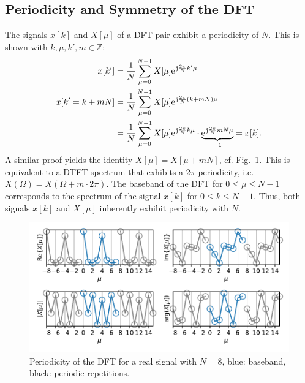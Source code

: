 \documentclass[11pt,a4paper,DIV=12]{scrartcl}
\begin{document}
\subsection{Periodicity and Symmetry of the DFT}
The signals $x[k]$ and $X[\mu]$ of a DFT pair exhibit a periodicity of $N$.
%
This is shown with $k,\mu,k',m\in\mathbb{Z}$:
\begin{align}
x[k']&=\frac{1}{N}\sum_{\mu=0}^{N-1}X[\mu]\e^{\im\frac{2\pi}{N}k'\mu}\\
x[k'=k+m N]&=\frac{1}{N}\sum_{\mu=0}^{N-1}X[\mu]\e^{\im\frac{2\pi}{N}(k+mN)\mu}\\
&=\frac{1}{N}\sum_{\mu=0}^{N-1}X[\mu]\e^{\im\frac{2\pi}{N}k\mu}\cdot\underbrace{\e^{\im\frac{2\pi}{N}mN\mu}}_{=1}=x[k].
\end{align}
%
A similar proof yields the identity $X[\mu]=X[\mu+mN]$, cf.
Fig.~\ref{Periodicity_DFT}.
%
This is equivalent to a DTFT spectrum that exhibits a $2\pi$ periodicity, i.e.
$X(\Omega)=X(\Omega+m\cdot2\pi)$.
%
The baseband of the DFT for $0\leq\mu\leq N-1$ corresponds to the spectrum of
the signal $x[k]$ for $0\leq k\leq N-1$.
%
Thus, both signals $x[k]$ and $X[\mu]$ inherently exhibit periodicity with $N$.
\begin{figure}[b!]
		\centering
		\includegraphics[width=12cm]{graphics/Periodicity_DFT.pdf}
		\caption{Periodicity of the DFT for a real signal with $N=8$,
		blue: baseband, black: periodic repetitions.}
		\label{Periodicity_DFT}
\end{figure}%
\end{document}
